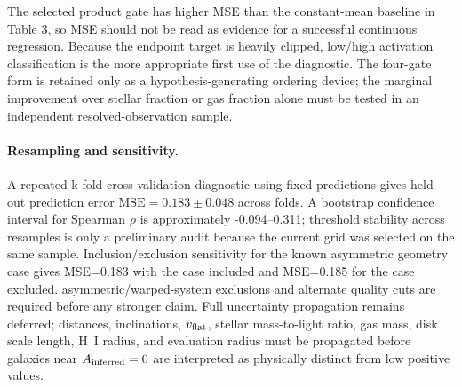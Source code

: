 \documentclass[11pt]{article}
\begin{document}
\begin{table}[H]
\centering
\scriptsize
\caption{Baseline comparison for preliminary SPARC activation ordering.}
\end{table}

The selected product gate has higher MSE than the constant-mean baseline in Table 3, so MSE should not be read as evidence for a successful continuous regression. Because the endpoint target is heavily clipped, low/high activation classification is the more appropriate first use of the diagnostic. The four-gate form is retained only as a hypothesis-generating ordering device; the marginal improvement over stellar fraction or gas fraction alone must be tested in an independent resolved-observation sample.

\paragraph{Resampling and sensitivity.} A repeated k-fold cross-validation diagnostic using fixed predictions gives held-out prediction error $\mathrm{MSE}=0.183\pm0.048$ across folds. A bootstrap confidence interval for Spearman $\rho$ is approximately -0.094--0.311; threshold stability across resamples is only a preliminary audit because the current grid was selected on the same sample. Inclusion/exclusion sensitivity for the known asymmetric geometry case gives MSE=0.183 with the case included and MSE=0.185 for the case excluded. asymmetric/warped-system exclusions and alternate quality cuts are required before any stronger claim. Full uncertainty propagation remains deferred; distances, inclinations, $v_{\rm flat}$, stellar mass-to-light ratio, gas mass, disk scale length, H~I radius, and evaluation radius must be propagated before galaxies near $A_{\rm inferred}=0$ are interpreted as physically distinct from low positive values.
\end{document}
